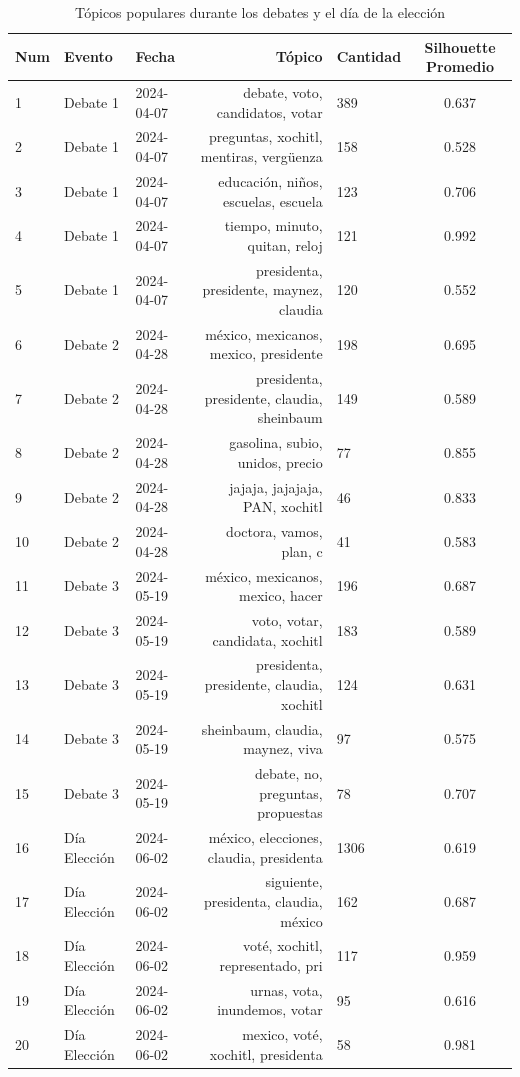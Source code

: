 \documentclass[10pt, a4paper]{article}
\begin{document}
	\begin{table}[H]
		\centering
		\begin{tabular}{|l|l|l|r|l|c|}
			\hline
			\textbf{Num} & \textbf{Evento} & \textbf{Fecha} & \textbf{Tópico} & \textbf{Cantidad} & \textbf{Silhouette Promedio} \\
			\hline
			1 & Debate 1 & 2024-04-07 & debate, voto, candidatos, votar & 389 & 0.637 \\
			2 & Debate 1 & 2024-04-07 & preguntas, xochitl, mentiras, vergüenza & 158 & 0.528 \\
			3 & Debate 1 & 2024-04-07 & educación, niños, escuelas, escuela & 123 & 0.706 \\
			4 & Debate 1 & 2024-04-07 & tiempo, minuto, quitan, reloj & 121 & 0.992 \\
			5 & Debate 1 & 2024-04-07 & presidenta, presidente, maynez, claudia & 120 & 0.552 \\
			6 & Debate 2 & 2024-04-28 & méxico, mexicanos, mexico, presidente & 198 & 0.695 \\
			7 & Debate 2 & 2024-04-28 & presidenta, presidente, claudia, sheinbaum & 149 & 0.589 \\
			8 & Debate 2 & 2024-04-28 & gasolina, subio, unidos, precio & 77 & 0.855 \\
			9 & Debate 2 & 2024-04-28 & jajaja, jajajaja, PAN, xochitl & 46 & 0.833 \\
			10 & Debate 2 & 2024-04-28 & doctora, vamos, plan, c & 41 & 0.583 \\
			11 & Debate 3 & 2024-05-19 & méxico, mexicanos, mexico, hacer & 196 & 0.687 \\
			12 & Debate 3 & 2024-05-19 & voto, votar, candidata, xochitl & 183 & 0.589 \\
			13 & Debate 3 & 2024-05-19 & presidenta, presidente, claudia, xochitl & 124 & 0.631 \\
			14 & Debate 3 & 2024-05-19 & sheinbaum, claudia, maynez, viva & 97 & 0.575 \\
			15 & Debate 3 & 2024-05-19 & debate, no, preguntas, propuestas & 78 & 0.707 \\
			16 & Día Elección & 2024-06-02 & méxico, elecciones, claudia, presidenta & 1306 & 0.619 \\
			17 & Día Elección & 2024-06-02 & siguiente, presidenta, claudia, méxico & 162 & 0.687 \\
			18 & Día Elección & 2024-06-02 & voté, xochitl, representado, pri & 117 & 0.959 \\
			19 & Día Elección & 2024-06-02 & urnas, vota, inundemos, votar & 95 & 0.616 \\
			20 & Día Elección & 2024-06-02 & mexico, voté, xochitl, presidenta & 58 & 0.981 \\
			\hline
		\end{tabular}
		\caption{Tópicos populares durante los debates y el día de la elección}
		\label{tab:topicos_seleccionados}
	\end{table}
	
\end{document}
